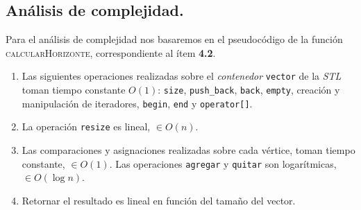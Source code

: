 \subsection{Análisis de complejidad.}

\vspace*{0.3cm}
 
Para el análisis de complejidad nos basaremos en el pseudocódigo de la función
\textsc{calcularHorizonte}, correspondiente al ítem \textbf{4.2}.
 
\begin{enumerate}
   \item Las siguientes operaciones realizadas sobre el \textit{contenedor} \verb|vector| de la \textit{STL} toman tiempo constante $O(1)$:
   \verb|size|, \verb|push_back|, \verb|back|, \verb|empty|, creación y manipulación de iteradores, \verb|begin|, \verb|end| 
   y \verb|operator[]|.
 
   \item La operación \verb|resize| es lineal, $\in O(n)$.
% 
% 
% 
% 
% 
 
 
   \item Las comparaciones y asignaciones realizadas sobre cada vértice, toman tiempo constante,  $\in O(1)$. 
   Las operaciones \verb|agregar| y \verb|quitar| son logarítmicas, $\in O(\log n)$.
 
   \item Retornar el resultado es lineal en función del tamaño del vector.
 \end{enumerate}
 
